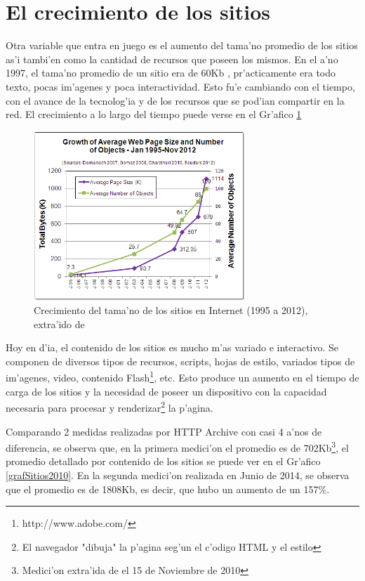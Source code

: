 \section{El crecimiento de los sitios}

Otra variable que entra en juego es el aumento del tama'no promedio de los sitios as'i tambi'en como la cantidad de recursos que poseen los mismos. En el a'no 1997, el tama'no promedio de un sitio era de 60Kb \citep{atw}, pr'acticamente era todo texto, pocas im'agenes y poca interactividad. Esto fu'e cambiando con el tiempo, con el avance de la tecnolog'ia y de los recursos que se pod'ian compartir en la red. El crecimiento a lo largo del tiempo puede verse en el Gr'afico \ref{grafCrecSitios}

\begin{figure}[ht!]
  	\centering
	\includegraphics[width=300px]{img/grafCrecSitios}
	\caption{\small Crecimiento del tama'no de los sitios en Internet (1995 a 2012), extra'ido de \cite{tamanoSitios}}
	\label{grafCrecSitios}
\end{figure}

Hoy en d'ia, el contenido de los sitios es mucho m'as variado e interactivo. Se componen de diversos tipos de recursos, scripts, hojas de estilo, variados tipos de im'agenes, video, contenido Flash\footnote{http://www.adobe.com/}, etc. Esto produce un aumento en el tiempo de carga de los sitios y la necesidad de poseer un dispositivo con la capacidad necesaria para procesar y renderizar\footnote{El navegador "dibuja" la p'agina seg'un el c'odigo HTML y el estilo} la p'agina.

Comparando 2 medidas realizadas por HTTP Archive\citep{httparchive}  con casi 4 a'nos de diferencia, se observa que, en la primera medici'on el promedio es de 702Kb\footnote{Medici'on extra'ida de \citep{httparchive} el 15 de Noviembre de 2010}, el promedio detallado por contenido de los sitios se puede ver en el Gr'afico \ref{grafSitios2010}. En la segunda medici'on realizada en Junio de 2014, se observa que el promedio es de 1808Kb, es decir, que hubo un aumento de un 157\%.

